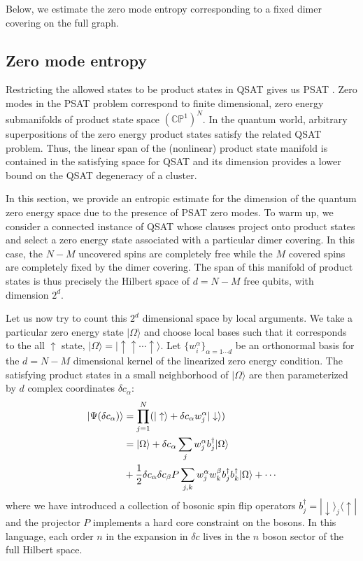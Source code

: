 \documentclass[aps,pra,twocolumn,superscriptaddress,amsmath]{revtex4-1}
\newcommand{\bra}[1]{\langle#1|}
\newcommand{\ket}[1]{|#1\rangle}
\newcommand{\up}{\uparrow}
\newcommand{\down}{\downarrow}
\newcommand{\f}[2]{{\ensuremath{\mathchoice%
       {\dfrac{#1}{#2}}
       {\dfrac{#1}{#2}}
       {\frac{#1}{#2}}
       {\frac{#1}{#2}}
       }}}
\newcommand{\set}[1]{\{ #1 \}}
\begin{document}
Below, we estimate the zero mode entropy corresponding to a fixed dimer covering on the full graph.

\subsection*{Zero mode entropy}

Restricting the allowed states to be product states in QSAT gives us PSAT \cite{Hsu2013}. Zero modes in the PSAT problem correspond to finite dimensional, zero energy submanifolds of  product state space $(\mathbb{CP}^1)^N$. In the quantum world, arbitrary superpositions of the zero energy product states satisfy the related QSAT problem. Thus, the linear span of the (nonlinear) product state manifold is contained in the satisfying space for QSAT and its dimension provides a lower bound on the QSAT degeneracy of a cluster.

In this section, we provide an entropic estimate for the dimension of the quantum zero energy space due to the presence of PSAT zero modes. To warm up, we consider a connected instance of QSAT whose clauses project onto product states and select a zero energy state associated with a particular dimer covering. In this case, the $N-M$ uncovered spins are completely free while the $M$ covered spins are completely fixed by the dimer covering. The span of this manifold of product states is thus precisely the Hilbert space of $d=N-M$ free qubits, with dimension $2^d$. 

Let us now try to count this $2^d$ dimensional space by local arguments. We take a particular zero energy state $\ket{\Omega}$ and choose local bases such that it corresponds to the all $\up$ state, $\ket{\Omega} = \ket{\up\up\cdots\up}$. Let $\set{w^{\alpha}_i}_{\alpha=1\cdots d}$ be an orthonormal basis for the $d=N-M$ dimensional kernel of the linearized zero energy condition. The satisfying product states in a small neighborhood of $\ket{\Omega}$ are then parameterized by $d$ complex coordinates $\delta c_\alpha$:
\begin{align}
	\ket{\Psi(\delta c_\alpha)} &= \prod_{j=1}^N(\ket{\up} + \delta c_\alpha w^\alpha_j \ket{\down}) \label{eq:prodexpansion}\\
	&=\ket{\Omega} + \delta c_\alpha \sum_j w_j^\alpha b^\dagger_j \ket{\Omega} \nonumber\\
	&+ \f{1}{2} \delta c_\alpha \delta c_\beta P \sum_{j, k}w^\alpha_j w^\beta_k b^\dagger_j b^\dagger_k \ket{\Omega} + \cdots \nonumber
\end{align}
where we have introduced a collection of bosonic spin flip operators $b^\dagger_j = \ket{\down}_j\!\bra{\up}$ and the projector $P$ implements a hard core constraint on the bosons. In this language, each order $n$ in the expansion in $\delta c$ lives in the $n$ boson sector of the full Hilbert space. 
\end{document}
